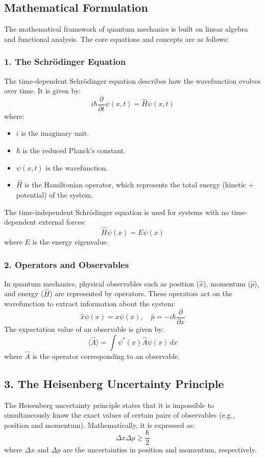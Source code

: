\subsection{Mathematical Formulation}
The mathematical framework of quantum mechanics is built on linear algebra and functional analysis. The core equations and concepts are as follows:

\subsubsection{1. The Schrödinger Equation}
The time-dependent Schrödinger equation describes how the wavefunction evolves over time. It is given by:
\[
i\hbar \frac{\partial}{\partial t} \psi(x,t) = \hat{H} \psi(x,t)
\]
where:
\begin{itemize}
    \item $i$ is the imaginary unit.
    \item $\hbar$ is the reduced Planck's constant.
    \item $\psi(x,t)$ is the wavefunction.
    \item $\hat{H}$ is the Hamiltonian operator, which represents the total energy (kinetic + potential) of the system.
\end{itemize}

The time-independent Schrödinger equation is used for systems with no time-dependent external forces:
\[
\hat{H} \psi(x) = E \psi(x)
\]
where $E$ is the energy eigenvalue.

\subsubsection{2. Operators and Observables}
In quantum mechanics, physical observables such as position ($\hat{x}$), momentum ($\hat{p}$), and energy ($\hat{H}$) are represented by operators. These operators act on the wavefunction to extract information about the system:
\[
\hat{x} \psi(x) = x \psi(x), \quad \hat{p} = -i\hbar \frac{\partial}{\partial x}
\]
The expectation value of an observable is given by:
\[
\langle \hat{A} \rangle = \int \psi^*(x) \hat{A} \psi(x) \, dx
\]
where $\hat{A}$ is the operator corresponding to an observable.

\subsection*{3. The Heisenberg Uncertainty Principle}
The Heisenberg uncertainty principle states that it is impossible to simultaneously know the exact values of certain pairs of observables (e.g., position and momentum). Mathematically, it is expressed as:
\[
\Delta x \Delta p \geq \frac{\hbar}{2}
\]
where $\Delta x$ and $\Delta p$ are the uncertainties in position and momentum, respectively.

